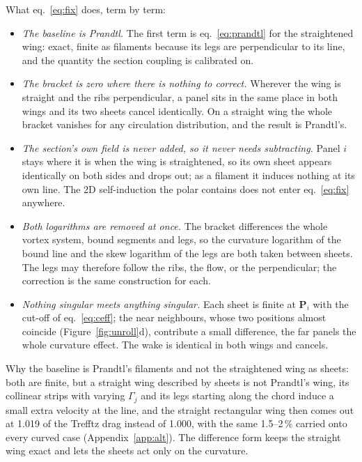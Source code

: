 \documentclass[11pt,a4paper]{article}
\begin{document}
What eq.~\eqref{eq:fix} does, term by term:
\begin{itemize}[nosep]
  \item \emph{The baseline is Prandtl.} The first term is eq.~\eqref{eq:prandtl} for the straightened wing: exact, finite as filaments because its legs are perpendicular to its line, and the quantity the section coupling is calibrated on.
  \item \emph{The bracket is zero where there is nothing to correct.} Wherever the wing is straight and the ribs perpendicular, a panel sits in the same place in both wings and its two sheets cancel identically. On a straight wing the whole bracket vanishes for any circulation distribution, and the result is Prandtl's.
  \item \emph{The section's own field is never added, so it never needs subtracting.} Panel $i$ stays where it is when the wing is straightened, so its own sheet appears identically on both sides and drops out; as a filament it induces nothing at its own line. The 2D self-induction the polar contains does not enter eq.~\eqref{eq:fix} anywhere.
  \item \emph{Both logarithms are removed at once.} The bracket differences the whole vortex system, bound segments and legs, so the curvature logarithm of the bound line and the skew logarithm of the legs are both taken between sheets. The legs may therefore follow the ribs, the flow, or the perpendicular; the correction is the same construction for each.
  \item \emph{Nothing singular meets anything singular.} Each sheet is finite at $\mathbf P_i$ with the cut-off of eq.~\eqref{eq:ceff}; the near neighbours, whose two positions almost coincide (Figure~\ref{fig:unroll}d), contribute a small difference, the far panels the whole curvature effect. The wake is identical in both wings and cancels.
\end{itemize}

Why the baseline is Prandtl's filaments and not the straightened wing as sheets: both are finite, but a straight wing described by sheets is not Prandtl's wing, its collinear strips with varying $\Gamma_j$ and its legs starting along the chord induce a small extra velocity at the line, and the straight rectangular wing then comes out at 1.019 of the Trefftz drag instead of 1.000, with the same 1.5--2\,\% carried onto every curved case (Appendix~\ref{app:alt}). The difference form keeps the straight wing exact and lets the sheets act only on the curvature.
\end{document}
